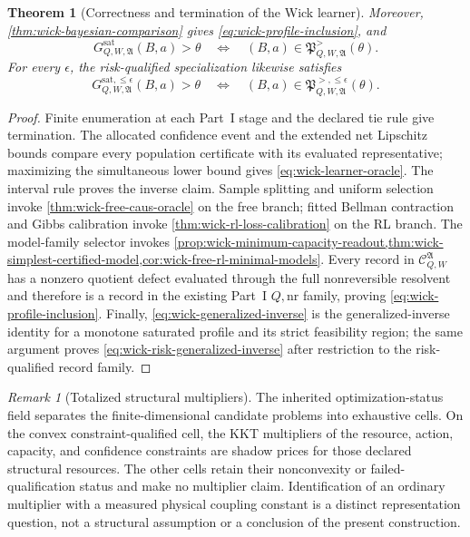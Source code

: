 \documentclass[11pt]{article}
\numberwithin{section}{part}
\theoremstyle{plain}
\newtheorem{theorem}{Theorem}[section]
\theoremstyle{definition}
\theoremstyle{remark}
\newtheorem{remark}[remark]{Remark}
\begin{document}
\begin{theorem}[Correctness and termination of the Wick learner]
Moreover, \cref{thm:wick-bayesian-comparison} gives
\eqref{eq:wick-profile-inclusion}, and
\begin{equation}
 \label{eq:wick-generalized-inverse}
 G_{Q,W,\mathfrak A}^{\mathrm{sat}}(B,a)>\theta
 \quad\Longleftrightarrow\quad
 (B,a)\in\mathfrak P_{Q,W,\mathfrak A}^{>}(\theta).
\end{equation}
For every \(\epsilon\), the risk-qualified specialization likewise satisfies
\begin{equation}
 \label{eq:wick-risk-generalized-inverse}
 G_{Q,W,\mathfrak A}^{\mathrm{sat},\le\epsilon}(B,a)>\theta
 \quad\Longleftrightarrow\quad
 (B,a)\in
 \mathfrak P_{Q,W,\mathfrak A}^{>,\le\epsilon}(\theta).
\end{equation}
\end{theorem}

\begin{proof}
Finite enumeration at each Part~I stage and the declared tie rule give
termination.  The allocated confidence event and the extended net Lipschitz
bounds compare every population certificate
with its evaluated representative; maximizing the simultaneous lower bound
gives \eqref{eq:wick-learner-oracle}.  The interval rule proves the inverse
claim.  Sample splitting and uniform selection invoke
\cref{thm:wick-free-caus-oracle} on the free branch; fitted Bellman
contraction and Gibbs calibration invoke
\cref{thm:wick-rl-loss-calibration} on the RL branch.  The model-family
selector invokes
\cref{prop:wick-minimum-capacity-readout,thm:wick-simplest-certified-model,cor:wick-free-rl-minimal-models}.
Every record in
\(\mathcal C_{Q,W}^{\mathfrak A}\) has a nonzero
quotient defect evaluated through the full nonreversible resolvent and
therefore is a record in the existing Part~I \(Q,\mathrm{nr}\) family,
proving
\eqref{eq:wick-profile-inclusion}.
Finally, \eqref{eq:wick-generalized-inverse} is the generalized-inverse
identity for a monotone saturated profile and its strict feasibility region;
the same argument proves \eqref{eq:wick-risk-generalized-inverse} after
restriction to the risk-qualified record family.
\end{proof}

\begin{remark}[Totalized structural multipliers]
\label{rem:wick-structural-multipliers}
The inherited optimization-status field separates the finite-dimensional
candidate problems into exhaustive cells.  On the convex
constraint-qualified cell, the KKT multipliers of the resource, action,
capacity, and confidence constraints are shadow prices for those declared
structural resources.  The other cells retain their nonconvexity or failed-
qualification status and make no multiplier claim.  Identification of an
ordinary multiplier with a measured physical coupling constant is a distinct
representation question, not a structural assumption or a conclusion of the
present construction.
\end{remark}
\end{document}
